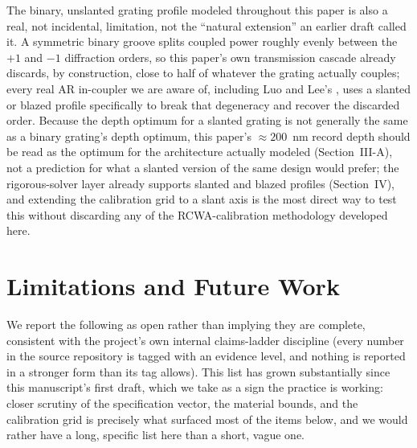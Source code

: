 \documentclass[10pt,twocolumn]{article}
\begin{document}
The binary, unslanted grating profile modeled throughout this paper is
also a real, not incidental, limitation, not the ``natural extension'' an
earlier draft called it. A symmetric binary groove splits coupled power
roughly evenly between the $+1$ and $-1$ diffraction orders, so this
paper's own transmission cascade already discards, by construction, close
to half of whatever the grating actually couples; every real AR in-coupler
we are aware of, including Luo and Lee's \cite{luo2024}, uses a slanted or
blazed profile specifically to break that degeneracy and recover the
discarded order. Because the depth optimum for a slanted grating is not
generally the same as a binary grating's depth optimum, this paper's
$\approx200$~nm record depth should be read as the optimum for the
architecture actually modeled (Section~III-A), not a prediction for what a
slanted version of the same design would prefer; the rigorous-solver layer
already supports slanted and blazed profiles (Section~IV), and extending
the calibration grid to a slant axis is the most direct way to test this
without discarding any of the RCWA-calibration methodology developed here.

\section{Limitations and Future Work}

We report the following as open rather than implying they are complete,
consistent with the project's own internal claims-ladder discipline (every
number in the source repository is tagged with an evidence level, and
nothing is reported in a stronger form than its tag allows). This list has
grown substantially since this manuscript's first draft, which we take as
a sign the practice is working: closer scrutiny of the specification
vector, the material bounds, and the calibration grid is precisely what
surfaced most of the items below, and we would rather have a long,
specific list here than a short, vague one.
\end{document}
